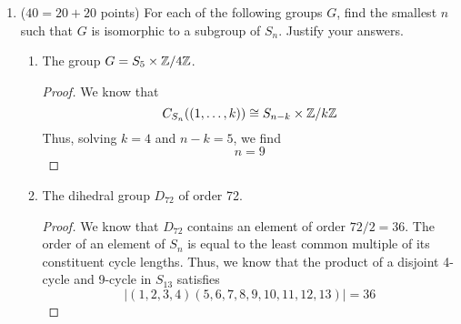 \documentclass[../psets.tex]{subfiles}
\begin{document}
\begin{enumerate}
\begin{enumerate}
\begin{proof}
\begin{equation*}
                |X| = \frac{144}{4} = 36
            \end{equation*}
            Let $S_6\acts X$ by conjugation. Since all 5-cycles are conjugate in $S_6$, the action is transitive. By the definition of the stabilizer and normalizer, we have that
            \begin{equation*}
                \Stab(H) = \{\sigma\in S_6\mid\sigma\cdot H=H\}
                = \{\sigma\in S_6\mid\sigma H\sigma^{-1}=H\}
                = N_{S_6}(H)
            \end{equation*}
            It follows by the orbit-stabilizer theorem that
            \begin{align*}
                |\Orb(H)|\cdot|\Stab(H)| &= |S_6|\\
                |N_{S_6}(H)| &= \frac{6!}{36}\\
                \Aboxed{|N_{S_6}(H)| &= 20}
            \end{align*}
        \end{proof}
    \end{enumerate}
    \item ($40=20+20$ points) For each of the following groups $G$, find the smallest $n$ such that $G$ is isomorphic to a subgroup of $S_n$. Justify your answers.
    \begin{enumerate}
        \item The group $G=S_5\times\mathbb{Z}/4\mathbb{Z}$.
        \begin{proof}
            We know that
            \begin{equation*}
                C_{S_n}((1,\dots,k)) \cong S_{n-k}\times\mathbb{Z}/k\mathbb{Z}
            \end{equation*}
            Thus, solving $k=4$ and $n-k=5$, we find
            \begin{equation*}
                \boxed{n = 9}
            \end{equation*}
        \end{proof}
        \item The dihedral group $D_{72}$ of order 72.
        \begin{proof}
            We know that $D_{72}$ contains an element of order $72/2=36$. The order of an element of $S_n$ is equal to the least common multiple of its constituent cycle lengths. Thus, we know that the product of a disjoint 4-cycle and 9-cycle in $S_{13}$ satisfies
            \begin{equation*}
                |(1,2,3,4)(5,6,7,8,9,10,11,12,13)| = 36
            \end{equation*}

\end{proof}
\end{enumerate}
\end{enumerate}
\end{document}
